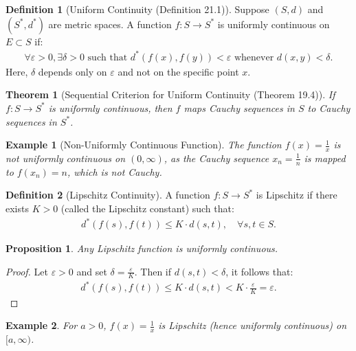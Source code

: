 \documentclass[7pt]{article}
\theoremstyle{definition}
\newtheorem{definition}{Definition}
\theoremstyle{plain}
\newtheorem{theorem}{Theorem}
\newtheorem{proposition}{Proposition}
\newtheorem{example}{Example}
\begin{document}
\begin{definition}[Uniform Continuity (Definition 21.1)]
Suppose $ (S, d) $ and $ (S^*, d^*) $ are metric spaces. A function $ f : S \to S^* $ is uniformly continuous on $ E \subset S $ if:
\begin{align}
\forall \varepsilon > 0, \exists \delta > 0 \text{ such that } d^*(f(x), f(y)) < \varepsilon \text{ whenever } d(x, y) < \delta.
\end{align}
Here, $ \delta $ depends only on $ \varepsilon $ and not on the specific point $ x $.
\end{definition}

\begin{theorem}[Sequential Criterion for Uniform Continuity (Theorem 19.4)]
If $ f : S \to S^* $ is uniformly continuous, then $ f $ maps Cauchy sequences in $ S $ to Cauchy sequences in $ S^* $.
\end{theorem}

\begin{example}[Non-Uniformly Continuous Function]
The function $ f(x) = \frac{1}{x} $ is not uniformly continuous on $ (0, \infty) $, as the Cauchy sequence $ x_n = \frac{1}{n} $ is mapped to $ f(x_n) = n $, which is not Cauchy.
\end{example}

\begin{definition}[Lipschitz Continuity]
A function $ f : S \to S^* $ is Lipschitz if there exists $ K > 0 $ (called the Lipschitz constant) such that:
\begin{align}
d^*(f(s), f(t)) \leq K \cdot d(s, t), \quad \forall s, t \in S.
\end{align}
\end{definition}

\begin{proposition}
Any Lipschitz function is uniformly continuous.
\end{proposition}

\begin{proof}
Let $ \varepsilon > 0 $ and set $ \delta = \frac{\varepsilon}{K} $. Then if $ d(s, t) < \delta $, it follows that:
\begin{align}
d^*(f(s), f(t)) \leq K \cdot d(s, t) < K \cdot \frac{\varepsilon}{K} = \varepsilon.
\end{align}
\end{proof}

\begin{example}
For $ a > 0 $, $ f(x) = \frac{1}{x} $ is Lipschitz (hence uniformly continuous) on $ [a, \infty) $.
\end{example}
\end{document}
